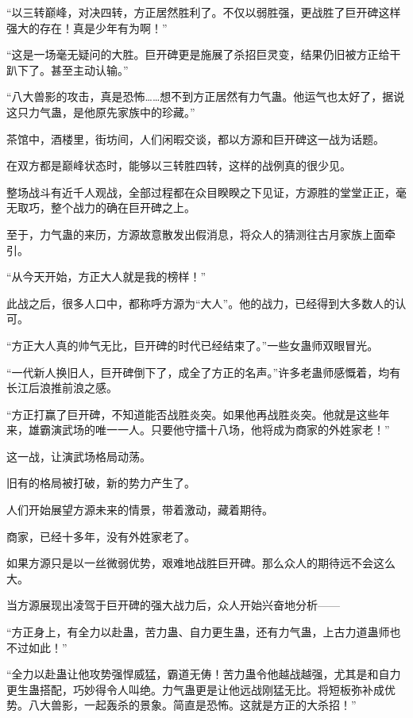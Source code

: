 
\begin{this_body}



“以三转巅峰，对决四转，方正居然胜利了。不仅以弱胜强，更战胜了巨开碑这样强大的存在！真是少年有为啊！”

“这是一场毫无疑问的大胜。巨开碑更是施展了杀招巨灵变，结果仍旧被方正给干趴下了。甚至主动认输。”

“八大兽影的攻击，真是恐怖……想不到方正居然有力气蛊。他运气也太好了，据说这只力气蛊，是他原先家族中的珍藏。”

茶馆中，酒楼里，街坊间，人们闲暇交谈，都以方源和巨开碑这一战为话题。

在双方都是巅峰状态时，能够以三转胜四转，这样的战例真的很少见。

整场战斗有近千人观战，全部过程都在众目睽睽之下见证，方源胜的堂堂正正，毫无取巧，整个战力的确在巨开碑之上。

至于，力气蛊的来历，方源故意散发出假消息，将众人的猜测往古月家族上面牵引。

“从今天开始，方正大人就是我的榜样！”

此战之后，很多人口中，都称呼方源为“大人”。他的战力，已经得到大多数人的认可。

“方正大人真的帅气无比，巨开碑的时代已经结束了。”一些女蛊师双眼冒光。

“一代新人换旧人，巨开碑倒下了，成全了方正的名声。”许多老蛊师感慨着，均有长江后浪推前浪之感。

“方正打赢了巨开碑，不知道能否战胜炎突。如果他再战胜炎突。他就是这些年来，雄霸演武场的唯一一人。只要他守擂十八场，他将成为商家的外姓家老！”

这一战，让演武场格局动荡。

旧有的格局被打破，新的势力产生了。

人们开始展望方源未来的情景，带着激动，藏着期待。

商家，已经十多年，没有外姓家老了。

如果方源只是以一丝微弱优势，艰难地战胜巨开碑。那么众人的期待远不会这么大。

当方源展现出凌驾于巨开碑的强大战力后，众人开始兴奋地分析——

“方正身上，有全力以赴蛊，苦力蛊、自力更生蛊，还有力气蛊，上古力道蛊师也不过如此！”

“全力以赴蛊让他攻势强悍威猛，霸道无俦！苦力蛊令他越战越强，尤其是和自力更生蛊搭配，巧妙得令人叫绝。力气蛊更是让他远战刚猛无比。将短板弥补成优势。八大兽影，一起轰杀的景象。简直是恐怖。这就是方正的大杀招！”


\end{this_body}
